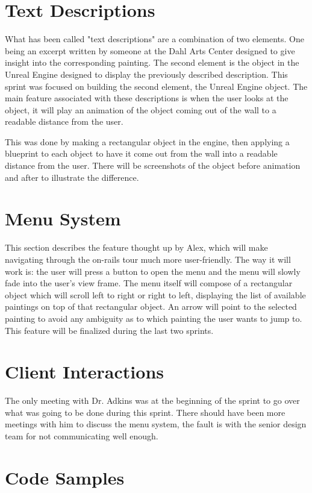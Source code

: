 \documentclass[11pt]{book}
\begin{document}
\section*{Text Descriptions}
What has been called "text descriptions" are a combination of two elements.  One being an excerpt written by someone at the Dahl Arts Center designed to give insight into the corresponding painting.  The second element is the object in the Unreal Engine designed to display the previously described description.  This sprint was focused on building the second element, the Unreal Engine object.  The main feature associated with these descriptions is when the user looks at the object, it will play an animation of the object coming out of the wall to a readable distance from the user.  

This was done by making a rectangular object in the engine, then applying a blueprint to each object to have it come out from the wall into a readable distance from the user.  There will be screenshots of the object before animation and after to illustrate the difference.

\section*{Menu System}
This section describes the feature thought up by Alex, which will make navigating through the on-rails tour much more user-friendly.  The way it will work is: the user will press a button to open the menu and the menu will slowly fade into the user's view frame.  The menu itself will compose of a rectangular object which will scroll left to right or right to left, displaying the list of available paintings on top of that rectangular object.  An arrow will point to the selected painting to avoid any ambiguity as to which painting the user wants to jump to.  This feature will be finalized during the last two sprints.

\section*{Client Interactions}
The only meeting with Dr. Adkins was at the beginning of the sprint to go over what was going to be done during this sprint.  There should have been more meetings with him to discuss the menu system, the fault is with the senior design team for not communicating well enough.

\section*{Code Samples}
\end{document}
